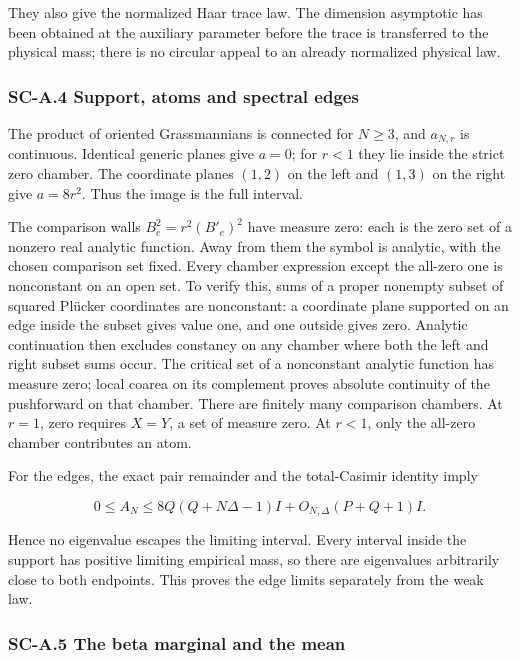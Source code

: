 \documentclass[a4paper,11pt]{article}
\numberwithin{equation}{section}
\begin{document}
They also give the normalized Haar trace law. The dimension asymptotic has been obtained at the auxiliary parameter before the trace is transferred to the physical mass; there is no circular appeal to an already normalized physical law.

\hypertarget{sc-a.4-support-atoms-and-spectral-edges}{%
\subsubsection{SC-A.4 Support, atoms and spectral edges}\label{sc-a.4-support-atoms-and-spectral-edges}}

The product of oriented Grassmannians is connected for \(N\geq3\), and \(a_{N,r}\) is continuous. Identical generic planes give \(a=0\); for \(r<1\) they lie inside the strict zero chamber. The coordinate planes \((1,2)\) on the left and \((1,3)\) on the right give \(a=8r^2\). Thus the image is the full interval.

The comparison walls \(B_e^2=r^2(B'_e)^2\) have measure zero: each is the zero set of a nonzero real analytic function. Away from them the symbol is analytic, with the chosen comparison set fixed. Every chamber expression except the all-zero one is nonconstant on an open set. To verify this, sums of a proper nonempty subset of squared Plücker coordinates are nonconstant: a coordinate plane supported on an edge inside the subset gives value one, and one outside gives zero. Analytic continuation then excludes constancy on any chamber where both the left and right subset sums occur. The critical set of a nonconstant analytic function has measure zero; local coarea on its complement proves absolute continuity of the pushforward on that chamber. There are finitely many comparison chambers. At \(r=1\), zero requires \(X=Y\), a set of measure zero. At \(r<1\), only the all-zero chamber contributes an atom.

For the edges, the exact pair remainder and the total-Casimir identity imply

\[
0\leq A_N\leq 8Q(Q+N\Delta-1)I+O_{N,\Delta}(P+Q+1)I.
\]

Hence no eigenvalue escapes the limiting interval. Every interval inside the support has positive limiting empirical mass, so there are eigenvalues arbitrarily close to both endpoints. This proves the edge limits separately from the weak law.

\hypertarget{sc-a.5-the-beta-marginal-and-the-mean}{%
\subsubsection{SC-A.5 The beta marginal and the mean}\label{sc-a.5-the-beta-marginal-and-the-mean}}
\end{document}
